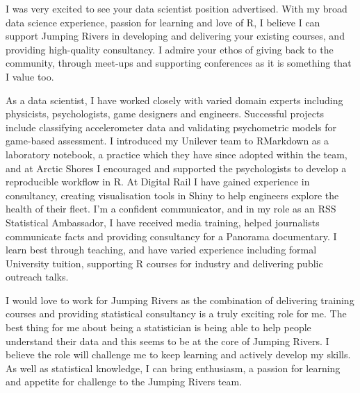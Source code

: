 \documentclass[11pt, a4paper]{awesome-cv}
\begin{document}
\makecvheader

\makelettertitle

\begin{cvletter}

I was very excited to see your data scientist position advertised. With my broad data science experience, passion for learning and love of R, I believe I can support Jumping Rivers in developing and delivering your existing courses, and providing high-quality consultancy. I admire your ethos of giving back to the community, through meet-ups and supporting conferences as it is something that I value too.

As a data scientist, I have worked closely with varied domain experts including physicists, psychologists, game designers and engineers. Successful projects include classifying accelerometer data and validating psychometric models for game-based assessment. I introduced my Unilever team to RMarkdown as a laboratory notebook, a practice which they have since adopted within the team, and at Arctic Shores I encouraged and supported the psychologists to develop a reproducible workflow in R. At Digital Rail I have gained experience in consultancy, creating visualisation tools in Shiny to help engineers explore the health of their fleet. I'm a confident communicator, and in my role as an RSS Statistical Ambassador, I have received media training, helped journalists communicate facts and providing consultancy for a Panorama documentary. I learn best through teaching, and have varied experience including formal University tuition, supporting R courses for industry and delivering public outreach talks.

I would love to work for Jumping Rivers as the combination of delivering training courses and providing statistical consultancy is a truly exciting role for me. The best thing for me about being a statistician is being able to help people understand their data and this seems to be at the core of Jumping Rivers. I believe the role will challenge me to keep learning and actively develop my skills. As well as statistical knowledge, I can bring enthusiasm, a passion for learning and appetite for challenge to the Jumping Rivers team.

\end{cvletter}

\makeletterclosing
\end{document}

